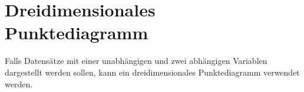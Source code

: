 \section{Dreidimensionales Punktediagramm}

Falls Datensätze mit einer unabhängigen und zwei abhängigen Variablen dargestellt werden sollen, kann ein dreidimensionales Punktediagramm verwendet werden.